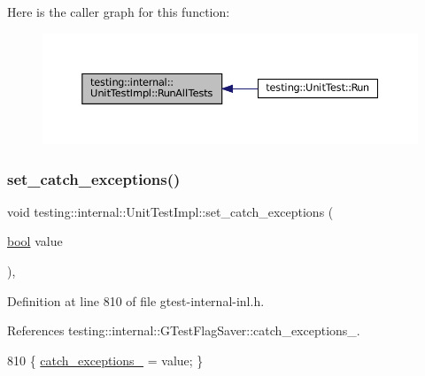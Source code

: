 Here is the caller graph for this function\+:
\nopagebreak
\begin{figure}[H]
\begin{center}
\leavevmode
\includegraphics[width=350pt]{classtesting_1_1internal_1_1UnitTestImpl_a1fb6be9971f4768c4136a05aa9e7e375_icgraph}
\end{center}
\end{figure}
\mbox{\label{classtesting_1_1internal_1_1UnitTestImpl_aefec23506cd772c3abc536cda301d926}} 
\subsubsection{\texorpdfstring{set\+\_\+catch\+\_\+exceptions()}{set\_catch\_exceptions()}}
{\footnotesize\ttfamily void testing\+::internal\+::\+Unit\+Test\+Impl\+::set\+\_\+catch\+\_\+exceptions (\begin{DoxyParamCaption}\item[{\hyperlink{classbool}{bool}}]{value }\end{DoxyParamCaption})\hspace{0.3cm}{\ttfamily [inline]}, {\ttfamily [private]}}



Definition at line 810 of file gtest-\/internal-\/inl.\+h.



References testing\+::internal\+::\+G\+Test\+Flag\+Saver\+::catch\+\_\+exceptions\+\_\+.


\begin{DoxyCode}
810 \{ \hyperlink{classtesting_1_1internal_1_1UnitTestImpl_a2cc0c6f466730b1d6e884738344b8e33}{catch\_exceptions\_} = value; \}
\end{DoxyCode}
\mbox{\label{classtesting_1_1internal_1_1UnitTestImpl_a7f0e79bdabd28819cc857e316a36a350}} 
